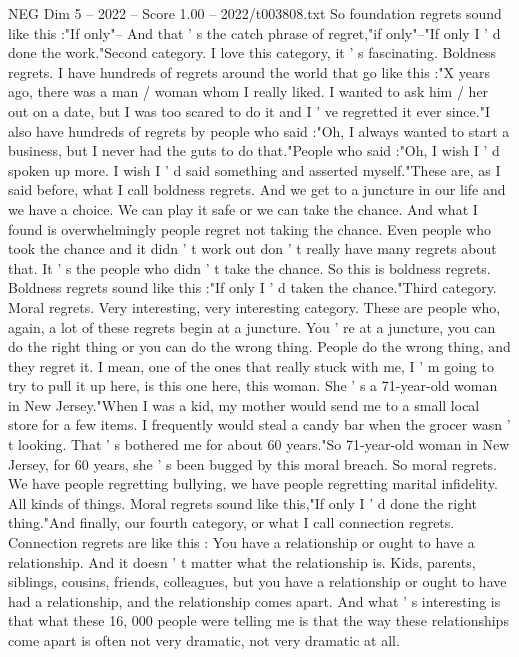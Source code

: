 \begin{textsample}{NEG Dim 5 – 2022 – Score 1.00 – 2022/t003808.txt}
So foundation regrets sound like this :"If only"-- And that ' s the catch phrase of regret,"if only"--"If only I ' d done the work."Second category.
I love this category, it ' s fascinating.
Boldness regrets.
I have hundreds of regrets around the world that go like this :"X years ago, there was a man / woman whom I really liked.
I wanted to ask him / her out on a date, but I was too scared to do it and I ' ve regretted it ever since."I also have hundreds of regrets by people who said :"Oh, I always wanted to start a business, but I never had the guts to do that."People who said :"Oh, I wish I ' d spoken up more.
I wish I ' d said something and asserted myself."These are, as I said before, what I call boldness regrets.
And we get to a juncture in our life and we have a choice.
We can play it safe or we can take the chance.
And what I found is overwhelmingly people regret not taking the chance.
Even people who took the chance and it didn ' t work out don ' t really have many regrets about that.
It ' s the people who didn ' t take the chance.
So this is boldness regrets.
Boldness regrets sound like this :"If only I ' d taken the chance."Third category.
Moral regrets.
Very interesting, very interesting category.
These are people who, again, a lot of these regrets begin at a juncture.
You ' re at a juncture, you can do the right thing or you can do the wrong thing.
People do the wrong thing, and they regret it.
I mean, one of the ones that really stuck with me, I ' m going to try to pull it up here, is this one here, this woman.
She ' s a 71-year-old woman in New Jersey."When I was a kid, my mother would send me to a small local store for a few items.
I frequently would steal a candy bar when the grocer wasn ' t looking.
That ' s bothered me for about 60 years."So 71-year-old woman in New Jersey, for 60 years, she ' s been bugged by this moral breach.
So moral regrets.
We have people regretting bullying, we have people regretting marital infidelity.
All kinds of things.
Moral regrets sound like this,"If only I ' d done the right thing."And finally, our fourth category, or what I call connection regrets.
Connection regrets are like this : You have a relationship or ought to have a relationship.
And it doesn ' t matter what the relationship is.
Kids, parents, siblings, cousins, friends, colleagues, but you have a relationship or ought to have had a relationship, and the relationship comes apart.
And what ' s interesting is that what these 16, 000 people were telling me is that the way these relationships come apart is often not very dramatic, not very dramatic at all.

\end{textsample}
